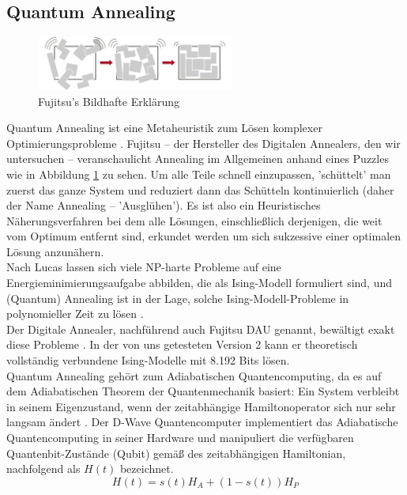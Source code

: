 \subsection{Quantum Annealing}
\label{subsec:anneal}
\begin{figure}
  \centering
  \includegraphics[width=0.58\textwidth]{images/fujitsu.jpg}
  \caption{Fujitsu's Bildhafte Erklärung}
  \label{fig:Annealing}
\end{figure}
Quantum Annealing ist eine Metaheuristik zum Lösen komplexer Optimierungsprobleme \cite{Feld2019}. Fujitsu -- der Hersteller des Digitalen Annealers, den wir untersuchen --  veranschaulicht Annealing im Allgemeinen anhand eines Puzzles wie in Abbildung \ref{fig:Annealing} zu sehen. Um alle Teile schnell einzupassen, 'schüttelt' man zuerst das ganze System  und reduziert dann das Schütteln kontinuierlich (daher der Name Annealing -- 'Ausglühen'). Es ist also ein Heuristisches Näherungsverfahren bei dem alle Lösungen, einschließlich derjenigen, die weit vom Optimum entfernt sind, erkundet werden um sich sukzessive einer optimalen Lösung anzunähern.\\
Nach Lucas \cite{Lucas2014} lassen sich viele NP-harte Probleme auf eine Energieminimierungsaufgabe abbilden, die als Ising-Modell formuliert sind, und (Quantum) Annealing ist in der Lage, solche Ising-Modell-Probleme in polynomieller Zeit zu lösen  \cite{Kadowaki1998}.\\
Der Digitale Annealer, nachführend auch Fujitsu DAU genannt, bewältigt exakt diese Probleme \cite{Tsukamoto2017}. In der von uns getesteten Version 2 kann er theoretisch vollständig verbundene Ising-Modelle mit 8.192 Bits lösen.\\
Quantum Annealing gehört zum Adiabatischen Quantencomputing, da es auf dem Adiabatischen Theorem der Quantenmechanik basiert: Ein System verbleibt in seinem Eigenzustand, wenn der zeitabhängige Hamiltonoperator sich nur sehr langsam ändert \cite{Griffiths1995}. Der D-Wave Quantencomputer implementiert das Adiabatische Quantencomputing in seiner Hardware und manipuliert die verfügbaren Quantenbit-Zustände (Qubit) gemäß des zeitabhängigen Hamiltonian, nachfolgend als $H(t)$ bezeichnet\cite{Feld2020}.
\begin{equation}
H(t)=s(t) H_{A}+(1-s(t)) H_{P}
\end{equation}
